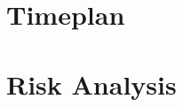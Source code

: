 \documentclass[12pt]{article} %
\begin{document}
\section{Timeplan}




\section{Risk Analysis} %









\newpage

\begin{appendices}

\end{appendices}
\end{document}
